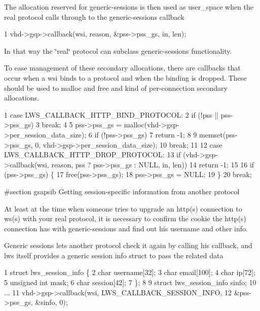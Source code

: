 The allocation reserved for generic-\/sessions is then used as user\+\_\+space when the real protocol calls through to the generic-\/sessions callback


\begin{DoxyCode}
1 vhd->gsp->callback(wsi, reason, &pss->pss\_gs, in, len);
\end{DoxyCode}


In that way the \char`\"{}real\char`\"{} protocol can subclass generic-\/sessions functionality.

To ease management of these secondary allocations, there are callbacks that occur when a wsi binds to a protocol and when the binding is dropped. These should be used to malloc and free and kind of per-\/connection secondary allocations.


\begin{DoxyCode}
1 case LWS\_CALLBACK\_HTTP\_BIND\_PROTOCOL:
2         if (!pss || pss->pss\_gs)
3                 break;
4 
5         pss->pss\_gs = malloc(vhd->gsp->per\_session\_data\_size);
6         if (!pss->pss\_gs)
7                 return -1;
8 
9         memset(pss->pss\_gs, 0, vhd->gsp->per\_session\_data\_size);
10         break;
11 
12 case LWS\_CALLBACK\_HTTP\_DROP\_PROTOCOL:
13         if (vhd->gsp->callback(wsi, reason, pss ? pss->pss\_gs : NULL, in, len))
14                 return -1;
15 
16         if (pss->pss\_gs) \{
17                 free(pss->pss\_gs);
18                 pss->pss\_gs = NULL;
19         \}
20         break;
\end{DoxyCode}


\#section gsapsib Getting session-\/specific information from another protocol

At least at the time when someone tries to upgrade an http(s) connection to ws(s) with your real protocol, it is necessary to confirm the cookie the http(s) connection has with generic-\/sessions and find out his username and other info.

Generic sessions lets another protocol check it again by calling his callback, and lws itself provides a generic session info struct to pass the related data


\begin{DoxyCode}
1 struct lws\_session\_info \{
2         char username[32];
3         char email[100];
4         char ip[72];
5         unsigned int mask;
6         char session[42];
7 \};
8 
9 struct lws\_session\_info sinfo;
10 ...
11 vhd->gsp->callback(wsi, LWS\_CALLBACK\_SESSION\_INFO,
12                            &pss->pss\_gs, &sinfo, 0);
\end{DoxyCode}


